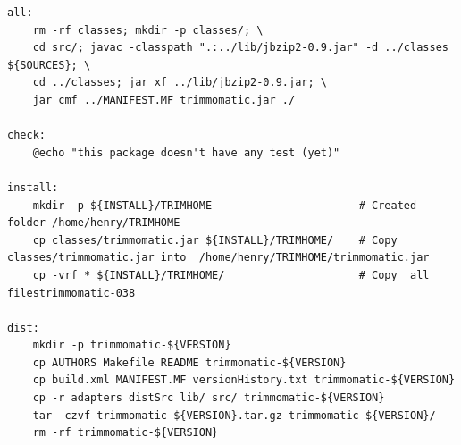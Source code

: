 \documentclass{article}
\begin{document}
\begin{itemize}
\begin{verbatim}
all:
	rm -rf classes; mkdir -p classes/; \
	cd src/; javac -classpath ".:../lib/jbzip2-0.9.jar" -d ../classes ${SOURCES}; \
	cd ../classes; jar xf ../lib/jbzip2-0.9.jar; \
	jar cmf ../MANIFEST.MF trimmomatic.jar ./

check:
	@echo "this package doesn't have any test (yet)"

install: 
	mkdir -p ${INSTALL}/TRIMHOME                       # Created folder /home/henry/TRIMHOME 
	cp classes/trimmomatic.jar ${INSTALL}/TRIMHOME/    # Copy  classes/trimmomatic.jar into  /home/henry/TRIMHOME/trimmomatic.jar
	cp -vrf * ${INSTALL}/TRIMHOME/                     # Copy  all filestrimmomatic-038

dist:
	mkdir -p trimmomatic-${VERSION}
	cp AUTHORS Makefile README trimmomatic-${VERSION}
	cp build.xml MANIFEST.MF versionHistory.txt trimmomatic-${VERSION}
	cp -r adapters distSrc lib/ src/ trimmomatic-${VERSION}
	tar -czvf trimmomatic-${VERSION}.tar.gz trimmomatic-${VERSION}/
	rm -rf trimmomatic-${VERSION}


\end{verbatim}
\end{itemize}
\end{document}

